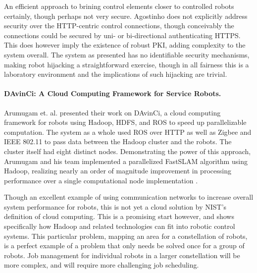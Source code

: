 \documentclass[10pt,letterpaper]{article}
\begin{document}
An efficient approach to brining control elements closer to controlled robots certainly, though perhaps not very secure.  Agostinho does not explicitly address security over the HTTP-centric control connections, though conceivably the connections could be secured by uni- or bi-directional authenticating HTTPS.  This does however imply the existence of robust PKI, adding complexity to the system overall.  The system as presented has no identifiable security mechanisms, making robot hijacking a straightforward exercise, though in all fairness this is a laboratory environment and the implications of such hijacking are trivial.

\paragraph{DAvinCi: A Cloud Computing Framework for Service Robots.}
Arumugam et. al. presented their work on DAvinCi, a cloud computing framework for robots using Hadoop, HDFS, and ROS to speed up parallelizable computation.  The system as a whole used ROS over HTTP as well as Zigbee and IEEE 802.11 to pass data between the Hadoop cluster and the robots.  The cluster itself had eight distinct nodes.  Demonstrating the power of this approach, Arumugam and his team implemented a parallelized FastSLAM algorithm using Hadoop, realizing nearly an order of magnitude improvement in processing performance over a single computational node implementation \cite{ArEnLiWu:10}.

Though an excellent example of using communication networks to increase overall system performance for robots, this is not yet a cloud solution by NIST's definition of cloud computing.  This is a promising start however, and shows specifically how Hadoop and related technologies can fit into robotic control systems.  This particular problem, mapping an area for a constellation of robots, is a perfect example of a problem that only needs be solved once for a group of robots.  Job management for individual robots in a larger constellation will be more complex, and will require more challenging job scheduling.



\end{document}
